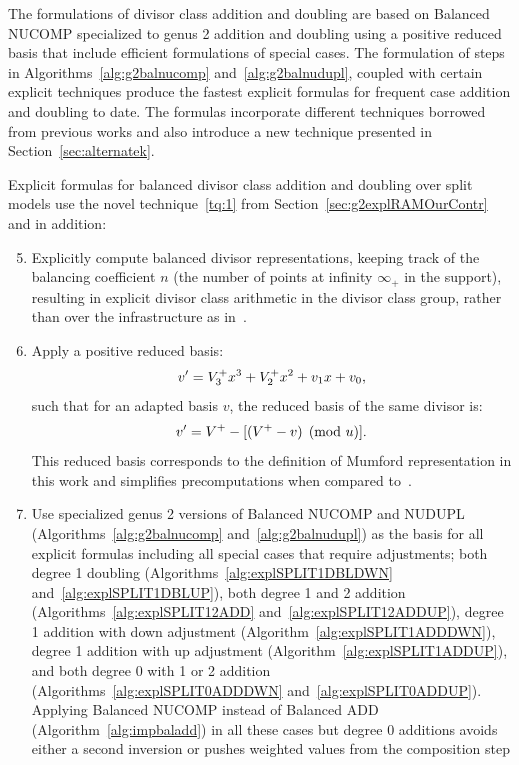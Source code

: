 The formulations of divisor class addition and doubling are based on Balanced
NUCOMP specialized to genus 2 addition and doubling using a positive reduced
basis that include efficient formulations of special cases. The formulation of
steps in Algorithms~\ref{alg:g2balnucomp} and~\ref{alg:g2balnudupl}, coupled
with certain explicit techniques produce the fastest explicit formulas for
frequent case addition and doubling to date. The formulas incorporate different
techniques borrowed from previous works and also introduce a new technique
presented in Section~\ref{sec:alternatek}. 

Explicit formulas for balanced divisor class addition and doubling over split
models use the novel technique~\ref{tq:1} from
Section~\ref{sec:g2explRAMOurContr} and in addition:
\begin{enumerate}[label=T\arabic*] \setcounter{enumi}{4}
\item \label{tq:5} Explicitly compute balanced divisor representations, keeping
track of the balancing coefficient $n$ (the number of points at infinity $\infty_+$
in the support), resulting in explicit divisor class arithmetic in the divisor
class group, rather than over the infrastructure as
in~\cite{EricksonJacobsonStein_realg2_2011}.
\item \label{tq:6} Apply a positive reduced basis: $$v' = V^{+}_3x^3 + V^{+}_2x^2 +
v_1x + v_0,$$ such that for an adapted basis $v$, the reduced basis of the same divisor is: $$v' =  V^{+}
- [(V^{+} - v) \pmod{u}].$$ This reduced basis corresponds to the definition of
Mumford representation in this work and simplifies precomputations when compared
to~\cite{EricksonJacobsonStein_realg2_2011}.
\item \label{tq:7} Use specialized genus 2 versions of Balanced NUCOMP and
NUDUPL (Algorithms~\ref{alg:g2balnucomp} and~\ref{alg:g2balnudupl}) as the basis for
all explicit formulas including all special cases that require adjustments;
both degree 1 doubling (Algorithms~\ref{alg:explSPLIT1DBLDWN}
and~\ref{alg:explSPLIT1DBLUP}), both degree 1 and 2 addition
(Algorithms~\ref{alg:explSPLIT12ADD} and~\ref{alg:explSPLIT12ADDUP}), degree 1
addition with down adjustment (Algorithm~\ref{alg:explSPLIT1ADDDWN}), degree 1
addition with up adjustment (Algorithm~\ref{alg:explSPLIT1ADDUP}), and both degree
0 with 1 or 2 addition (Algorithms~\ref{alg:explSPLIT0ADDDWN}
and~\ref{alg:explSPLIT0ADDUP}). Applying Balanced NUCOMP instead of Balanced ADD
(Algorithm~\ref{alg:impbaladd}) in all these cases but degree 0 additions avoids
either a second inversion or pushes weighted values from the composition step

\end{enumerate}
